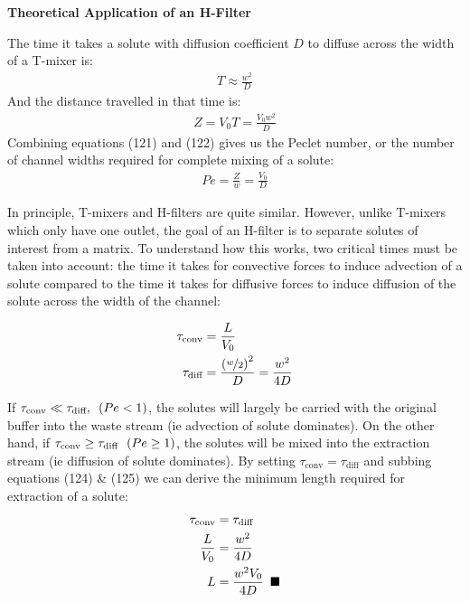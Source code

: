 \documentclass[titlepage]{article}
\begin{document}
\newpage
\section{}
\begin{center}
    \large
    \textbf{Theoretical Application of an H-Filter} \\
\end{center} 
\normalsize 

\noindent The time it takes a solute with diffusion coefficient $D$ to diffuse across the width of a T-mixer is: 
\begin{align}
    T \approx \displaystyle\frac{w^2}{D}
\end{align}
\noindent And the distance travelled in that time is: 
\begin{align}
    Z = V_{0}T = \displaystyle\frac{V_{0}w^2}{D}
\end{align}
\noindent Combining equations (121) and (122) gives us the Peclet number, or the number of channel widths required for complete mixing of a solute: 
\begin{align}
    Pe = \displaystyle\frac{Z}{w}=\displaystyle\frac{V_{0}}{D}
\end{align}

\noindent In principle, T-mixers and H-filters are quite similar. However, unlike T-mixers which only have one outlet, the goal of an H-filter is to separate solutes of interest from a matrix. To understand how this works, two critical times must be taken into account: the time it takes for convective forces to induce advection of a solute compared to the time it takes for diffusive forces to induce diffusion of the solute across the width of the channel: 

\begin{align}
    \tau_{\text{conv}}&=\displaystyle\frac{L}{V_{0}} \\
    \tau_{\text{diff}}&=\displaystyle\frac{\displaystyle\left({\nicefrac{w}{2}}\right)^2}{D}=\displaystyle\frac{w^2}{4D}
\end{align}

\noindent If $\tau_{\text{conv}} \ll \tau_{\text{diff}}, \hspace*{5pt} \left(Pe<1\right)$, the solutes will largely be carried with the original buffer into the waste stream (ie advection of solute dominates). On the other hand, if $\tau_{\text{conv}} \geq  \tau_{\text{diff}}\hspace*{5pt} \left(Pe \geq 1\right)$, the solutes will be mixed into the extraction stream (ie diffusion of solute dominates). By setting $\tau_{\text{conv}}=\tau_{\text{diff}}$ and subbing equations (124) \& (125) we can derive the minimum length required for extraction of a solute: 
\begin{align}
    \tau_{\text{conv}} &= \tau_{\text{diff}} \\
    \displaystyle\frac{L}{V_{0}} &= \displaystyle\frac{w^2}{4D} \\
    L &= \displaystyle\frac{w^2{V_{0}}}{4D} \hspace*{5pt}\blacksquare
\end{align}
\end{document}
